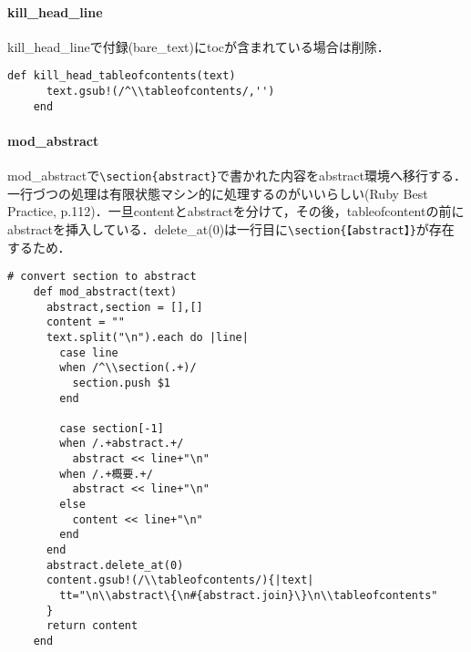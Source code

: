\paragraph{kill\_head\_line}
kill\_head\_lineで付録(bare\_text)にtocが含まれている場合は削除．
\begin{lstlisting}[style=customRuby]
    def kill_head_tableofcontents(text)
      text.gsub!(/^\\tableofcontents/,'')
    end
\end{lstlisting}
\paragraph{mod\_abstract}
mod\_abstractで\verb|\section{abstract}|で書かれた内容をabstract環境へ移行する．一行づつの処理は有限状態マシン的に処理するのがいいらしい(Ruby Best Practice, p.112)．一旦contentとabstractを分けて，その後，tableofcontentの前にabstractを挿入している．delete\_at(0)は一行目に\verb|\section{【abstract】}|が存在するため．
\begin{lstlisting}[style=customRuby]
# convert section to abstract
    def mod_abstract(text)
      abstract,section = [],[]
      content = ""
      text.split("\n").each do |line|
        case line
        when /^\\section(.+)/
          section.push $1
        end

        case section[-1]
        when /.+abstract.+/
          abstract << line+"\n"
        when /.+概要.+/
          abstract << line+"\n"
        else
          content << line+"\n"
        end
      end
      abstract.delete_at(0)
      content.gsub!(/\\tableofcontents/){|text|
        tt="\n\\abstract\{\n#{abstract.join}\}\n\\tableofcontents"
      }
      return content
    end
\end{lstlisting}
